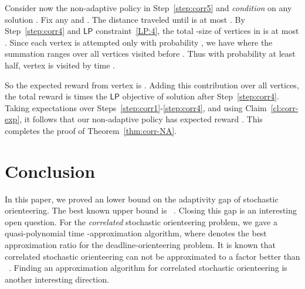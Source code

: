 \documentclass[11pt,letterpaper]{article}
\numberwithin{algorithm}{section}
\newcommand{\lp}{\ensuremath{\mathsf{LP}}\xspace}
\begin{document}
Consider now the non-adaptive policy in Step~\ref{step:corr5} and {\em condition} on any solution . Fix any  and  . The distance traveled until  is at most . By Step~\ref{step:corr4} and \lp constraint~\eqref{LP:4}, the total -size of vertices in  is at most . Since each vertex is attempted only with probability , we have
 where the summation ranges over all vertices visited before . Thus with probability at least half, vertex  is visited  by time .

So the expected reward from vertex  is .
Adding this contribution over all vertices, the total reward is  times the \lp objective of solution  after Step~\ref{step:corr4}. Taking expectations over Steps~\ref{step:corr1}-\ref{step:corr4}, and using Claim~\ref{cl:corr-exp}, it follows that our non-adaptive policy has expected reward . This completes the proof of Theorem~\ref{thm:corr-NA}.


\section{Conclusion}
In this paper, we proved an  lower bound on the adaptivity gap of stochastic orienteering. The best known upper bound  is ~\cite{GKNR12}. Closing this gap is an interesting open question. For the {\em correlated} stochastic orienteering problem, we gave a quasi-polynomial time -approximation algorithm, where  denotes the best approximation ratio for the deadline-orienteering problem. It is known that correlated stochastic orienteering can not be approximated to a factor better than ~\cite{GKNR12}. Finding an  approximation algorithm for correlated stochastic orienteering is another interesting direction.




\end{document}
